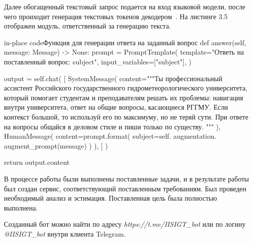 Далее обогащенный текстовый запрос подается на вход языковой модели, после чего
проиходит генерация текстовых токенов декодером~\cite{a}. На листинге 3.5
отображен модуль, ответственный за генерацию текста.

\begin{codepiece}{in-place code}{Функция для генерации ответа на заданный вопрос}
        def answer(self, message: Message) -> None:
            prompt = PromptTemplate(
                template="Ответь на поставленный вопрос: {subject}",
                input_variables=["subject"],
            )
    
            output = self.chat(
                [
                    SystemMessage(
                        content="""Ты профессиональный ассистент Российского
                        государственного гидрометеорологического университета,
                        который помогает студентам и преподавателям решать их
                        проблемы: навигация внутри университета, ответ на общие
                        вопросы, касающиеся РГГМУ. Если контекст большой, то
                        используй его по максимуму, но не теряй сути.
                        При ответе на вопросы общайся в деловом стиле и пиши
                        только по существу. """
                    ),
                    HumanMessage(
                        content=prompt.format(
                            subject=self.
                            augmentation.
                            augment_prompt(message)
                        )
                    ),
                ]
            )
    
            return output.content
\end{codepiece}


В процессе работы были выполнены поставленные задачи, и в результате работы был
создан сервис, соответствующий поставленным требованиям. Был проведен
необходимый анализ и эстимация. Поставленная цель была полностью выполнена.

Созданный бот можно найти по адресу \emph{https://t.me/IISIGT\_bot} или по логину 
\emph{@IISIGT\_bot} внутри клиента Telegram.

\showbib


